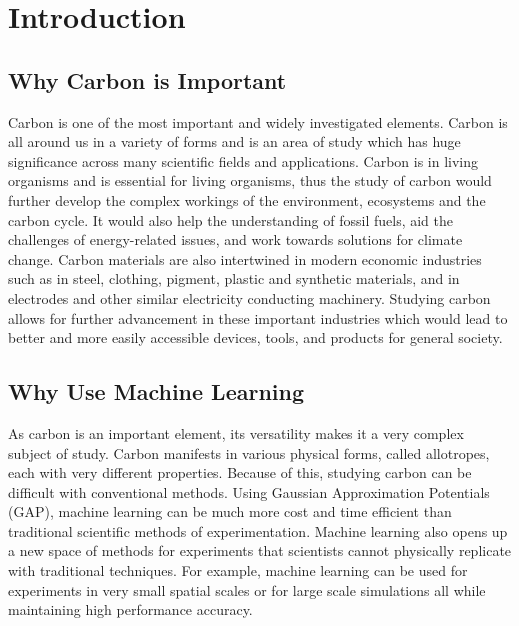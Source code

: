 \documentclass[12pt, abstract = true]{scrartcl}
\begin{document}
\newpage

\section{Introduction}\label{Introduction}

\subsection{Why Carbon is Important}


Carbon is one of the most important and widely investigated
elements. Carbon is all around us in a variety of forms and is an area
of study which has huge significance across many scientific fields and
applications. Carbon is in living organisms and is essential for
living organisms, thus the study of carbon would further develop the
complex workings of the environment, ecosystems and the carbon
cycle. It would also help the understanding of fossil fuels, aid the
challenges of energy-related issues, and work towards solutions for
climate change. Carbon materials are also intertwined in modern
economic industries such as in steel, clothing, pigment, plastic and
synthetic materials, and in electrodes and other similar electricity
conducting machinery. Studying carbon allows for further advancement
in these important industries which would lead to better and more
easily accessible devices, tools, and products for general society.

\subsection{Why Use Machine Learning}
As carbon is an important element, its versatility makes it a very
complex subject of study. Carbon manifests in various physical forms,
called allotropes, each with very different properties. Because of
this, studying carbon can be difficult with conventional
methods. Using Gaussian Approximation Potentials (GAP), machine
learning can be much more cost and time efficient than traditional
scientific methods of experimentation. Machine learning also opens up
a new space of methods for experiments that scientists
cannot physically replicate with traditional techniques. For example,
machine learning can be used for experiments in very small spatial
scales or for large scale simulations all while maintaining high
performance accuracy.

\newpage
\end{document}
